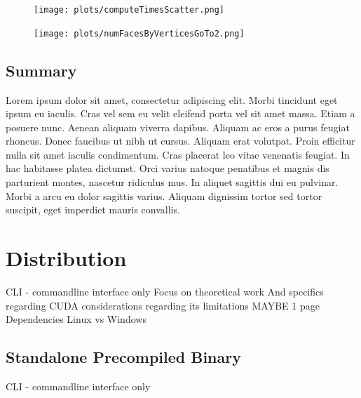 \documentclass[openany]{book}
\begin{document}
\begin{figure}
	\centering
	\texttt{[image: plots/computeTimesScatter.png]}
\end{figure}

\begin{figure}
	\centering
	\texttt{[image: plots/numFacesByVerticesGoTo2.png]}
\end{figure}





\section{Summary}
Lorem ipsum dolor sit amet, consectetur adipiscing elit. Morbi tincidunt eget 
ipsum eu iaculis. Cras vel sem eu velit eleifend porta vel sit amet massa. Etiam 
a posuere nunc. Aenean aliquam viverra dapibus. Aliquam ac eros a purus feugiat 
rhoncus. Donec faucibus ut nibh ut cursus. Aliquam erat volutpat. Proin efficitur 
nulla sit amet iaculis condimentum. Cras placerat leo vitae venenatis feugiat. In 
hac habitasse platea dictumst. Orci varius natoque penatibus et magnis dis 
parturient montes, nascetur ridiculus mus. In aliquet sagittis dui eu pulvinar. 
Morbi a arcu eu dolor sagittis varius. Aliquam dignissim tortor sed tortor 
suscipit, eget imperdiet mauris convallis.



\chapter{Distribution}
CLI - commandline interface only
Focus on theoretical work 
And specifics regarding CUDA considerations regarding its limitations
MAYBE 1 page
Dependencies
Linux vs Windows



\section{Standalone Precompiled Binary}
CLI - commandline interface only
\end{document}
